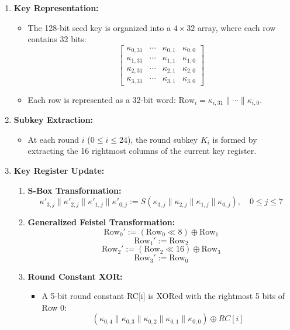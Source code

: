 \documentclass[journal=tosc,preprint]{iacrtrans}
\begin{document}
\begin{enumerate}
    \item \textbf{Key Representation:}
    \begin{itemize}
        \item The 128-bit seed key is organized into a \(4 \times 32\) array, where each row contains 32 bits:
        \[
        \begin{bmatrix}
        \kappa_{0,31} & \cdots & \kappa_{0,1} & \kappa_{0,0} \\
        \kappa_{1,31} & \cdots & \kappa_{1,1} & \kappa_{1,0} \\
        \kappa_{2,31} & \cdots & \kappa_{2,1} & \kappa_{2,0} \\
        \kappa_{3,31} & \cdots & \kappa_{3,1} & \kappa_{3,0}
        \end{bmatrix}
        \]
        \item Each row is represented as a 32-bit word: \(\text{Row}_i = \kappa_{i,31} \| \cdots \| \kappa_{i,0}\).
    \end{itemize}
    
    \item \textbf{Subkey Extraction:}
    \begin{itemize}
        \item At each round \(i\) (\(0 \leq i \leq 24\)), the round subkey \(K_i\) is formed by extracting the 16 rightmost columns of the current key register.
    \end{itemize}
    
    \item \textbf{Key Register Update:}
    \begin{enumerate}
        \item \textbf{S-Box Transformation:}
        \[
        \kappa'_{3,j} \| \kappa'_{2,j} \| \kappa'_{1,j} \| \kappa'_{0,j} := S(\kappa_{3,j} \| \kappa_{2,j} \| \kappa_{1,j} \| \kappa_{0,j}), \quad 0 \leq j \leq 7
        \]
        
        \item \textbf{Generalized Feistel Transformation:}
        \[
        \text{Row}_0' := (\text{Row}_0 \ll 8) \oplus \text{Row}_1
        \]
        \[
        \text{Row}_1' := \text{Row}_2
        \]
        \[
        \text{Row}_2' := (\text{Row}_2 \ll 16) \oplus \text{Row}_3
        \]
        \[
        \text{Row}_3' := \text{Row}_0
        \]
        
        \item \textbf{Round Constant XOR:}
        \begin{itemize}
            \item A 5-bit round constant RC[i] is XORed with the rightmost 5 bits of Row 0:
        \[
        (\kappa_{0,4} \| \kappa_{0,3} \| \kappa_{0,2} \| \kappa_{0,1} \| \kappa_{0,0}) \oplus RC[i]
        \]


\end{itemize}
\end{enumerate}
\end{enumerate}
\end{document}
